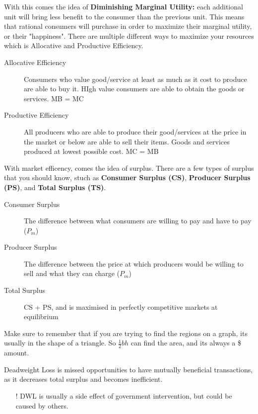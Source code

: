 With this comes the idea of \textbf{Diminishing Marginal Utility:} each additional unit will bring less benefit to the consumer than the previous unit. This means that rational consumers will purchase in order to maximize their marginal utility, or their "happiness". There are multiple different ways to maximize your resources which is Allocative and Productive Efficiency.

\begin{description}
    \item[Allocative Efficiency] Consumers who value good/service at least as much as it cost to produce are able to buy it. HIgh value consumers are able to obtain the goods or services. MB = MC
    \item[Productive Efficiency] All producers who are able to produce their good/services at the price in the market or below are able to sell their items. Goods and services produced at lowest possible cost. MC = MB
\end{description}

With market efficency, comes the idea of surplus. There are a few types of surplus that you should know, stuch as \textbf{Consumer Surplus (CS)}, \textbf{Producer Surplus (PS)}, and \textbf{Total Surplus (TS)}.
\begin{description}
    \item[Consumer Surplus] The difference between what consumers are willing to pay and have to pay ($P_m$)
    \item[Producer Surplus] The difference between the price at which producers would be willing to sell and what they can charge ($P_m$)
    \item[Total Surplus] CS + PS, and is maximised in perfectly competitive markets at equilibrium
\end{description}
Make sure to remember that if you are trying to find the regions on a graph, its usually in the shape of a triangle. So $\frac{1}{2}bh$ can find the area, and its always a \$ amount. 

\begin{definition}
    Deadweight Loss is missed opportunities to have mutually beneficial transactions, as it decreases total surplus and becomes inefficient. 
\end{definition}
\begin{itemize}
    \item[!] DWL is usually a side effect of government intervention, but could be caused by others.
\end{itemize}

